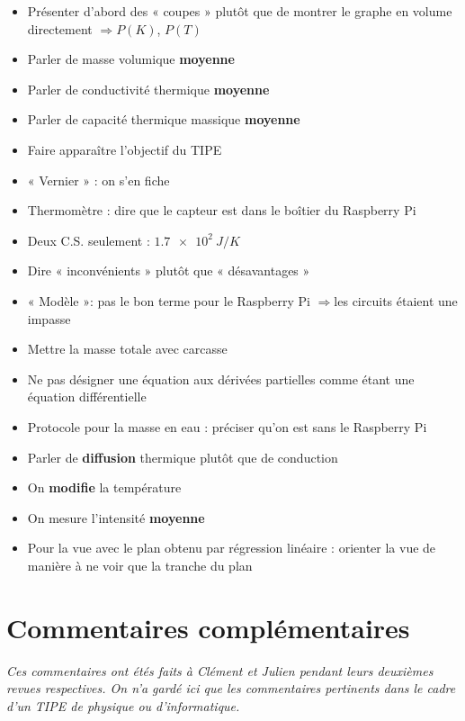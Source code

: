 \documentclass{article}
\newcommand{\fleche}{$\Rightarrow {}$}
\begin{document}
\begin{itemize}
    \item Présenter d'abord des « coupes » plutôt que de montrer le graphe en volume directement \fleche $P(K)$, $P(T)$
    \item Parler de masse volumique \textbf{moyenne}
    \item Parler de conductivité thermique \textbf{moyenne}
    \item Parler de capacité thermique massique \textbf{moyenne}
    \item Faire apparaître l'objectif du TIPE
    \item « Vernier » : on s'en fiche
    \item Thermomètre : dire que le capteur est dans le boîtier du Raspberry Pi
    \item Deux C.S. seulement : $\SI{1,7e2}{J/K}$
    \item Dire « inconvénients » plutôt que « désavantages »
    \item « Modèle »: pas le bon terme pour le Raspberry Pi \fleche les circuits étaient une impasse
    \item Mettre la masse totale avec carcasse
    \item Ne pas désigner une équation aux dérivées partielles comme étant une équation différentielle
    \item Protocole pour la masse en eau : préciser qu'on est sans le Raspberry Pi
    \item Parler de \textbf{diffusion} thermique plutôt que de conduction
    \item On \textbf{modifie} la température
    \item On mesure l'intensité \textbf{moyenne}
    \item Pour la vue avec le plan obtenu par régression linéaire : orienter la vue de manière à ne voir que la tranche du plan
\end{itemize}

\section*{Commentaires complémentaires}

\textit{Ces commentaires ont étés faits à Clément et Julien pendant leurs deuxièmes revues respectives. On n'a gardé ici que les commentaires pertinents dans le cadre d'un TIPE de physique ou d'informatique.}

\vspace{1em}
\end{document}
